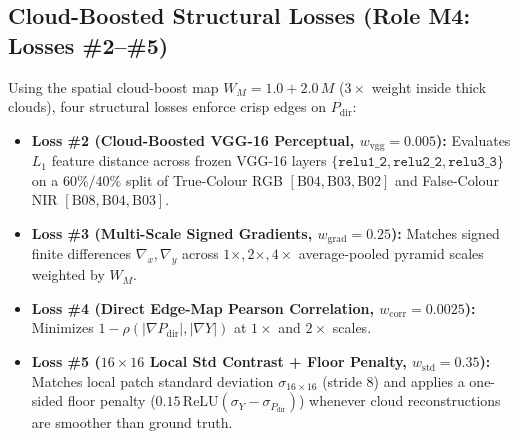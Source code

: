 \documentclass[12pt,a4paper]{report}
\begin{document}
\subsection{Cloud-Boosted Structural Losses (Role M4: Losses \#2--\#5)}
Using the spatial cloud-boost map $W_M = 1.0 + 2.0\,M$ ($3\times$ weight inside thick clouds), four structural losses enforce crisp edges on $P_{\text{dir}}$:
\begin{itemize}
    \item \textbf{Loss \#2 (Cloud-Boosted VGG-16 Perceptual, $w_{\text{vgg}} = 0.005$):} Evaluates $L_1$ feature distance across frozen VGG-16 layers $\{\texttt{relu1\_2}, \texttt{relu2\_2}, \texttt{relu3\_3}\}$ on a $60\%/40\%$ split of True-Colour RGB $[\text{B04},\text{B03},\text{B02}]$ and False-Colour NIR $[\text{B08},\text{B04},\text{B03}]$.
    \item \textbf{Loss \#3 (Multi-Scale Signed Gradients, $w_{\text{grad}} = 0.25$):} Matches signed finite differences $\nabla_x, \nabla_y$ across $1\times, 2\times, 4\times$ average-pooled pyramid scales weighted by $W_M$.
    \item \textbf{Loss \#4 (Direct Edge-Map Pearson Correlation, $w_{\text{corr}} = 0.0025$):} Minimizes $1 - \rho(|\nabla P_{\text{dir}}|, |\nabla Y|)$ at $1\times$ and $2\times$ scales.
    \item \textbf{Loss \#5 ($16\times 16$ Local Std Contrast + Floor Penalty, $w_{\text{std}} = 0.35$):} Matches local patch standard deviation $\sigma_{16\times 16}$ (stride 8) and applies a one-sided floor penalty ($0.15\,\text{ReLU}(\sigma_Y - \sigma_{P_{\text{dir}}})$) whenever cloud reconstructions are smoother than ground truth.
\end{itemize}
\end{document}
